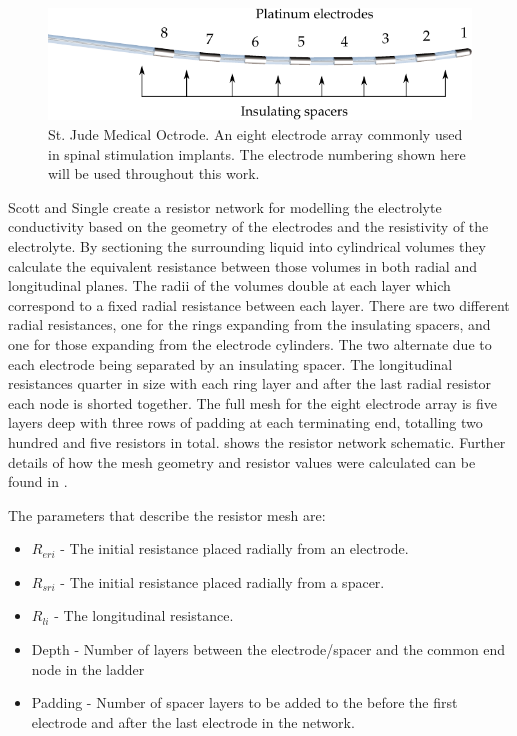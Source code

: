     \begin{figure}
      \centering
      \includegraphics{content/pt2/07-InterfaceModel/graphics/StJudeOctrodeDiagram}
      \caption{\label{fig:StJudeOctrode_Labelled}St. Jude Medical Octrode. An eight electrode array commonly used in spinal stimulation implants. The electrode numbering shown here will be used throughout this work.}
    \end{figure}


    Scott and Single create a resistor network for modelling the electrolyte conductivity based on the geometry of the electrodes and the resistivity of the electrolyte.
    By sectioning the surrounding liquid into cylindrical volumes they calculate the equivalent resistance between those volumes in both radial and longitudinal planes.
    The radii of the volumes double at each layer which correspond to a fixed radial resistance between each layer.
    There are two different radial resistances, one for the rings expanding from the insulating spacers, and one for those expanding from the electrode cylinders.
    The two alternate due to each electrode being separated by an insulating spacer.
    The longitudinal resistances quarter in size with each ring layer and after the last radial resistor each node is shorted together.
    The full mesh for the eight electrode array is five layers deep with three rows of padding at each terminating end, totalling two hundred and five resistors in total.
     shows the resistor network schematic.
    Further details of how the mesh geometry and resistor values were calculated can be found in \cite{Scott2014}.

    The parameters that describe the resistor mesh are:
    \begin{itemize}
    \item $R_{eri}$ - The initial resistance placed radially from an electrode.
    \item $R_{sri}$ - The initial resistance placed radially from a spacer.
    \item $R_{li}$ - The longitudinal resistance.
    \item Depth - Number of layers between the electrode/spacer and the common end node in the ladder
    \item Padding - Number of spacer layers to be added to the before the first electrode and after the last electrode in the network.
    \end{itemize}

